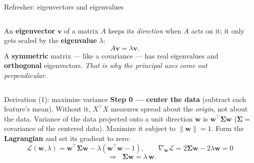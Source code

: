 \documentclass[aspectratio=169]{beamer}
\begin{document}
\begin{frame}{Refresher: eigenvectors and eigenvalues}
  \begin{columns}[T]
    An \textbf{eigenvector} $\bm{v}$ of a matrix $A$ keeps its \emph{direction} when $A$ acts on it;
    it only gets scaled by the \textbf{eigenvalue} $\lambda$:
    \[ A\bm{v} = \lambda \bm{v}. \]
    \vskip 4pt
    A \textbf{symmetric} matrix --- like a covariance --- has real eigenvalues and
    \textbf{orthogonal} eigenvectors. \emph{That is why the principal axes come out perpendicular.}
    \begin{center}
    \end{center}
  \end{columns}
\end{frame}

\begin{frame}{Derivation (1): maximize variance}
  \textbf{Step 0 --- center the data} (subtract each feature's mean). Without it, $X^\top X$ measures
  spread about the \emph{origin}, not about the data.
  \vfill
  Variance of the data projected onto a unit direction $\bm{w}$ is $\bm{w}^\top \bm{\Sigma}\bm{w}$
  ($\bm{\Sigma}=$ covariance of the centered data). Maximize it subject to $\|\bm{w}\|=1$.
  Form the \textbf{Lagrangian} and set its gradient to zero:
  \[
    \mathcal{L}(\bm{w},\lambda) = \bm{w}^\top\bm{\Sigma}\bm{w} - \lambda(\bm{w}^\top\bm{w}-1),
    \qquad
    \nabla_{\bm{w}}\mathcal{L} = 2\bm{\Sigma}\bm{w} - 2\lambda\bm{w} = 0
  \]
  \[
    \;\;\Longrightarrow\;\; \bm{\Sigma}\bm{w} = \lambda\,\bm{w}.
  \]
  \vfill
\end{frame}
\end{document}
